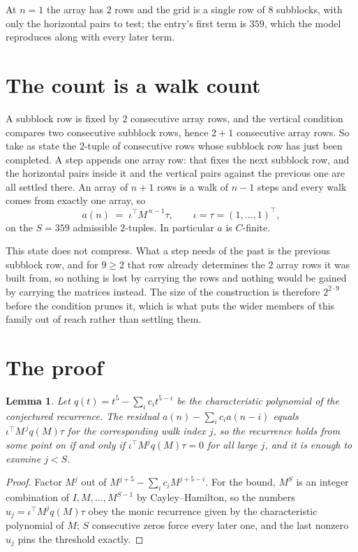 \documentclass[11pt,a4paper]{article}
\theoremstyle{plain}
\newtheorem{lemma}[theorem]{Lemma}
\theoremstyle{definition}
\begin{document}
At $n=1$ the array has $2$ rows and the grid is a single row of $8$
subblocks, with only the horizontal pairs to test; the entry's first term is
$359$, which the model reproduces along with every later term.

\section{The count is a walk count}

A subblock row is fixed by $2$ consecutive array rows, and the vertical condition compares
two consecutive subblock rows, hence $2+1$ consecutive array rows. So take as state the
$2$-tuple of consecutive rows whose subblock row has just been completed. A step appends one
array row: that fixes the next subblock row, and the horizontal pairs inside it and the
vertical pairs against the previous one are all settled there. An array of $n+1$ rows is
a walk of $n-1$ steps and every walk comes from exactly one array, so
\[
a(n)\;=\;\iota^{\!\top}M^{\,n-1}\tau,\qquad\iota=\tau=(1,\dots,1)^{\!\top},
\]
on the $S=359$ admissible $2$-tuples. In particular $a$ is $C$-finite.

This state does not compress. What a step needs of the past is the previous subblock row, and
for $9\ge2$ that row already determines the $2$ array rows it was built from, so nothing
is lost by carrying the rows and nothing would be gained by carrying the matrices instead. The
size of the construction is therefore $2^{2\cdot9}$ before the condition prunes
it, which is what puts the wider members of this family out of reach rather than settling them.

\section{The proof}

\begin{lemma}\label{lem:crit}
Let $q(t)=t^{5}-\sum_i c_it^{5-i}$ be the characteristic polynomial of the
conjectured recurrence. The residual $a(n)-\sum_ic_ia(n-i)$ equals
$\iota^{\!\top}M^{\,j}q(M)\tau$ for the corresponding walk index $j$, so the recurrence
holds from some point on if and only if $\iota^{\!\top}M^{j}q(M)\tau=0$ for all large $j$,
and it is enough to examine $j<S$.
\end{lemma}

\begin{proof}
Factor $M^{j}$ out of $M^{j+5}-\sum_ic_iM^{j+5-i}$. For the bound, $M^{S}$
is an integer combination of $I,M,\dots,M^{S-1}$ by Cayley--Hamilton, so the numbers
$u_j=\iota^{\!\top}M^{j}q(M)\tau$ obey the monic recurrence given by the characteristic
polynomial of $M$; $S$ consecutive zeros force every later one, and the last nonzero $u_j$
pins the threshold exactly.
\end{proof}
\end{document}
